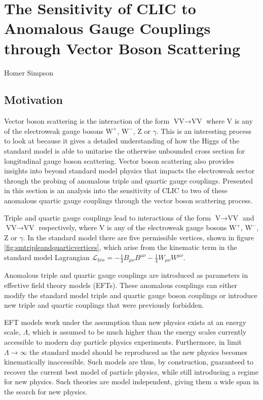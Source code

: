 \chapter{The Sensitivity of CLIC to Anomalous Gauge Couplings through Vector Boson Scattering}
\label{chap:PhysicsAnalysis}

%
{Homer Simpson}


\section{Motivation}
Vector boson scattering is the interaction of the form $\text{VV} \rightarrow \text{VV}$ where V is any of the electroweak gauge bosons $\text{W}^{+}$, $\text{W}^{-}$, Z or $\gamma$.  This is an interesting process to look at because it gives a detailed understanding of how the Higgs of the standard model is able to unitarise the otherwise unbounded cross section for longitudinal gauge boson scattering.  Vector boson scattering also provides insights into beyond standard model physics that impacts the electroweak sector through the probing of anomalous triple and quartic gauge couplings.  Presented in this section is an analysis into the sensitivity of CLIC to two of these anomalous quartic gauge couplings through the vector boson scattering process.

Triple and quartic gauge couplings lead to interactions of the form $\text{V} \rightarrow \text{VV}$ and $\text{VV} \rightarrow \text{VV}$ respectively, where V is any of the electroweak gauge bosons $\text{W}^{+}$, $\text{W}^{-}$, Z or $\gamma$.  In the standard model there are five permissible  vertices, shown in figure \ref{fig:smtripleandquarticvertices}, which arise from the kinematic term in the standard model Lagrangian $\mathcal{L}_{kin} = -\frac{1}{4}B_{\mu\nu}B^{\mu\nu} - \frac{1}{4}W_{\mu\nu}W^{\mu\nu}$.

Anomalous triple and quartic gauge couplings are introduced as parameters in effective field theory models (EFTs).  These anomalous couplings can either modify the standard model triple and quartic gauge boson couplings or introduce new triple and quartic couplings that were previously forbidden.  

EFT models work under the assumption than new physics exists at an energy scale, $\Lambda$, which is assumed to be much higher than the energy scales currently accessible to modern day particle physics experiments.  Furthermore, in limit $\Lambda \rightarrow \infty$ the standard model should be reproduced as the new physics becomes kinematically inaccessible.  Such models are thus, by construction, guaranteed to recover the current best model of particle physics, while still introducing a regime for new physics.  Such theories are model independent, giving them a wide span in the search for new physics.

